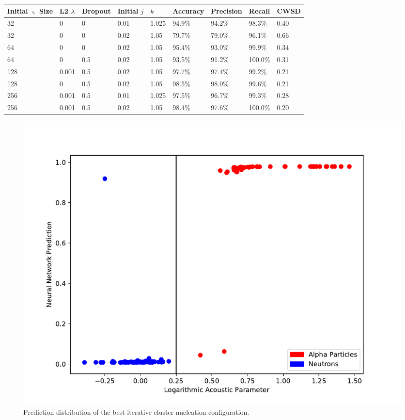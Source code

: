 \documentclass[10pt]{article}
\begin{document}
\begin{minipage}{\textwidth}
    \begin{center}
         \label{icn_overview}
        \begin{tabular}{|l|l|l|l|l|l|l|l|l|}
            \hline
            Initial $\varsigma$ Size & L2 $\lambda$ & Dropout & Initial $j$ & $k$ & Accuracy & Precision & Recall & CWSD \\
            \hline
            32 & 0 & 0 & 0.01 & 1.025 & 94.9\% & 94.2\% & 98.3\% & 0.40 \\
            \hline
            32 & 0 & 0 & 0.02 & 1.05 & 79.7\% & 79.0\% & 96.1\% & 0.66 \\
            \hline
            64 & 0 & 0 & 0.02 & 1.05 & 95.4\% & 93.0\% & 99.9\% & 0.34 \\
            \hline
            64 & 0 & 0.5 & 0.02 & 1.05 & 93.5\% & 91.2\% & 100.0\% & 0.31 \\
            \hline
            128 & 0.001 & 0.5 & 0.02 & 1.05 & 97.7\% & 97.4\% & 99.2\% & 0.21 \\
            \hline
            128 & 0 & 0.5 & 0.02 & 1.05 & 98.5\% & 98.0\% & 99.6\% & 0.21 \\
            \hline
            256 & 0.001 & 0.5 & 0.01 & 1.025 & 97.5\% & 96.7\% & 99.3\% & 0.28 \\
            \hline
            256 & 0.001 & 0.5 & 0.02 & 1.05 & 98.4\% & 97.6\% & 100.0\% & 0.20 \\
            \hline
        \end{tabular}
    \end{center}
\end{minipage}

\begin{figure}[h]
    \centering
    \includegraphics[width=\textwidth]{icn_grid_search}
    \caption{\label{icn_grid_search} Prediction distribution of the best iterative cluster nucleation configuration.}
\end{figure}
\end{document}

